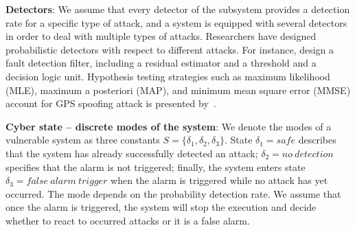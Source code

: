 \textbf{Detectors}: We assume that every detector of the subsystem provides a detection rate for a specific type of attack, and a system is equipped with several detectors in order to deal with multiple types of attacks. Researchers have designed probabilistic detectors with respect to different attacks. For instance, \cite{fd_filter} design a fault detection filter, including a residual estimator and a threshold and a decision logic unit. Hypothesis testing strategies such as maximum likelihood (MLE), maximum a posteriori (MAP), and minimum mean square error (MMSE) account for GPS spoofing attack is presented by~\cite{GPS_spoof}. %


\textbf{Cyber state -- discrete modes of the system}:
We denote the modes of a vulnerable system as three constants $S=\{\delta_1,\delta_2, \delta_3\}$. State $\delta_{1}=safe$ describes that the system has already successfully detected an attack; $\delta_{2}= no~detection$ specifies that the alarm is not triggered; finally, the system enters state $\delta_{3}= false~alarm~trigger$ when the alarm is triggered while no attack has yet occurred. The mode depends on the probability detection rate. We assume that once the alarm is triggered, the system will stop the execution and decide whether to react to occurred attacks or it is a false alarm. %


\iffalse
For the steady state Kalman filter, a $\chi^2$ detector triggers the alarm when the estimation residual is greater than the threshold with a specific false detection rate.
It is worth noting that even without the knowledge of system dynamics, a replay attacker can compromise values from all sensors. 
\fi

